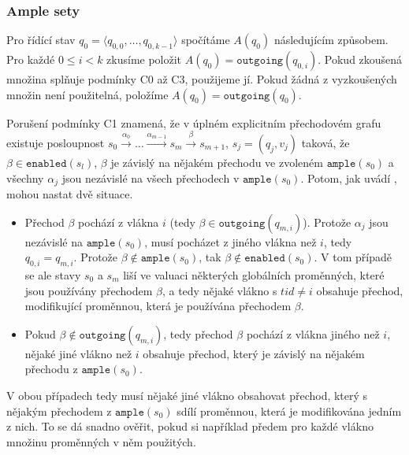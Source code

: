 \documentclass[10pt,a4paper,notitlepage]{report}
\newcommand{\tuple}[1]{\langle #1 \rangle}
\begin{document}
\subsubsection{Ample sety}
Pro řídící stav $q_0 = \tuple{q_{0,0}, \ldots, q_{0,k-1}}$ spočítáme $A(q_0)$ následujícím způsobem. Pro každé $0 \leq i < k$ zkusíme položit $A(q_0) = \texttt{outgoing}(q_{0,i})$. Pokud zkoušená množina splňuje podmínky C0 až C3, použijeme jí. Pokud žádná z vyzkoušených množin není použitelná, položíme $A(q_0) = \texttt{outgoing}(q_0)$.

Porušení podmínky C1 \label{subsec:c1-violation} znamená, že v úplném explicitním přechodovém grafu existuje posloupnost $s_0 \xrightarrow{\alpha_0} \ldots \xrightarrow{\alpha_{m-1}} s_m \xrightarrow{\beta} s_{m+1}$, $s_j = (q_j, v_j)$ taková, že $\beta \in \texttt{enabled}(s_l)$, $\beta$ je závislý na nějakém přechodu ve zvoleném $\texttt{ample}(s_0)$ a všechny $\alpha_j$ jsou nezávislé na všech přechodech v $\texttt{ample}(s_0)$. Potom, jak uvádí \cite{CLARKE}, mohou nastat dvě situace.

\begin{itemize}
\item Přechod $\beta$ pochází z vlákna $i$ (tedy $\beta \in \texttt{outgoing}(q_{m,i})$).  Protože $\alpha_j$ jsou nezávislé na $\texttt{ample}(s_0)$, musí pocházet z jiného vlákna než $i$, tedy $q_{0,i} = q_{m,i}$. Protože $\beta \not \in \texttt{ample}(s_0)$, tak $\beta \not \in \texttt{enabled}(s_0)$. V tom případě se ale stavy $s_0$ a $s_m$ liší ve valuaci některých globálních proměnných, které jsou používány přechodem $\beta$, a tedy nějaké vlákno s $tid \neq i$ obsahuje přechod, modifikující proměnnou, která je používána přechodem $\beta$.

\item Pokud $\beta \not \in \texttt{outgoing}(q_{m,i})$, tedy přechod $\beta$ pochází z vlákna jiného než $i$, nějaké jiné vlákno než $i$ obsahuje přechod, který je závislý na nějakém přechodu z $\texttt{ample}(s_0)$. 
\end{itemize}

V obou případech tedy musí nějaké jiné vlákno obsahovat přechod, který s nějakým přechodem z $\texttt{ample}(s_0)$ sdílí proměnnou, která je modifikována jedním z nich. To se dá snadno ověřit, pokud si například předem pro každé vlákno množinu proměnných v něm použitých.

\end{document}

